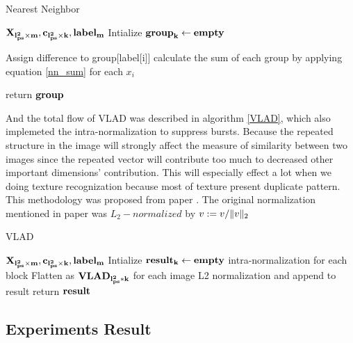 \documentclass[final,leqno,onefignum,onetabnum]{siamltexmm}
\DeclarePairedDelimiter\norm{\lVert}{\rVert}%
\begin{document}

\begin{algorithm}[H]
	\caption{Nearest Neighbor}
	\label{NN}
	\begin{algorithmic}[1]
		 {$\bf{X}_{l_{ps}^2 \times m}, \bf{c}_{l_{ps}^2 \times k} , \bf{label}_m$}
		\State Intialize $\bf{group}_{k} \gets empty$
		
		\State Assign difference to group[label[i]] 
		\State calculate the sum of each group by applying equation \eqref{nn_sum} for each $x_i$
		
		\EndFor
		\State return $\bf{group}$
		\EndProcedure
	\end{algorithmic}
\end{algorithm}

And the total flow of VLAD was described in algorithm \ref{VLAD}, which also implemeted the intra-normalization to suppress bursts. Because the repeated structure in the image will strongly affect the measure of similarity between two images since the repeated vector will contribute too much to decreased other important dimensions' contribution. This will especially effect a lot when we doing texture recognization because most of texture present duplicate pattern. This methodology was proposed from paper \cite{vlad_normalized}. The original normalization mentioned in paper \cite{vlad} was $L_2-normalized$ by $v:=v/\norm{v}_2$ 

\begin{algorithm}[H]
	\caption{VLAD}
	\label{VLAD}
	\begin{algorithmic}[1]
		 {$\bf{X}_{l_{ps}^2 \times m}, \bf{c}_{l_{ps}^2 \times k} , \bf{label}_m$}
		\State Intialize $\bf{result}_{k} \gets empty$
		\State intra-normalization for each block
		\EndFor
		\State Flatten as $\bf{VLAD}_{l_{ps}^2*k}$ for each image
		\State L2 normalization and append to result
		\EndFor
		\State return $\bf{result}$
		\EndProcedure
	\end{algorithmic}
\end{algorithm}





\subsection {Experiments Result}
\end{document}

